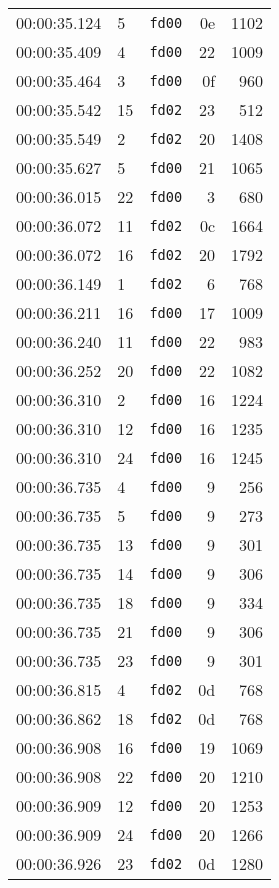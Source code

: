 \documentclass{article}
\begin{document}
\begin{longtable}{lllrr}
00:00:35.124 & 5 & \texttt{fd00} & 0e & 1102 \\
00:00:35.409 & 4 & \texttt{fd00} & 22 & 1009 \\
00:00:35.464 & 3 & \texttt{fd00} & 0f & 960 \\
00:00:35.542 & 15 & \texttt{fd02} & 23 & 512 \\
00:00:35.549 & 2 & \texttt{fd02} & 20 & 1408 \\
00:00:35.627 & 5 & \texttt{fd00} & 21 & 1065 \\
00:00:36.015 & 22 & \texttt{fd00} & 3 & 680 \\
00:00:36.072 & 11 & \texttt{fd02} & 0c & 1664 \\
00:00:36.072 & 16 & \texttt{fd02} & 20 & 1792 \\
00:00:36.149 & 1 & \texttt{fd02} & 6 & 768 \\
00:00:36.211 & 16 & \texttt{fd00} & 17 & 1009 \\
00:00:36.240 & 11 & \texttt{fd00} & 22 & 983 \\
00:00:36.252 & 20 & \texttt{fd00} & 22 & 1082 \\
00:00:36.310 & 2 & \texttt{fd00} & 16 & 1224 \\
00:00:36.310 & 12 & \texttt{fd00} & 16 & 1235 \\
00:00:36.310 & 24 & \texttt{fd00} & 16 & 1245 \\
00:00:36.735 & 4 & \texttt{fd00} & 9 & 256 \\
00:00:36.735 & 5 & \texttt{fd00} & 9 & 273 \\
00:00:36.735 & 13 & \texttt{fd00} & 9 & 301 \\
00:00:36.735 & 14 & \texttt{fd00} & 9 & 306 \\
00:00:36.735 & 18 & \texttt{fd00} & 9 & 334 \\
00:00:36.735 & 21 & \texttt{fd00} & 9 & 306 \\
00:00:36.735 & 23 & \texttt{fd00} & 9 & 301 \\
00:00:36.815 & 4 & \texttt{fd02} & 0d & 768 \\
00:00:36.862 & 18 & \texttt{fd02} & 0d & 768 \\
00:00:36.908 & 16 & \texttt{fd00} & 19 & 1069 \\
00:00:36.908 & 22 & \texttt{fd00} & 20 & 1210 \\
00:00:36.909 & 12 & \texttt{fd00} & 20 & 1253 \\
00:00:36.909 & 24 & \texttt{fd00} & 20 & 1266 \\
00:00:36.926 & 23 & \texttt{fd02} & 0d & 1280 \\

\end{longtable}
\end{document}
